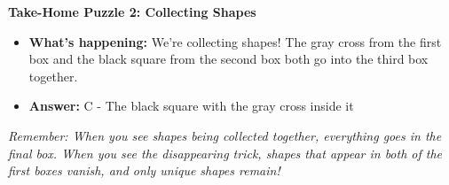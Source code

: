 \documentclass{article}
\begin{document}
\vspace{0.3cm}
\textbf{Take-Home Puzzle 2: Collecting Shapes}
\begin{itemize}
    \item \textbf{What's happening:} We're collecting shapes! The gray cross from the first box and the black square from the second box both go into the third box together.
    \item \textbf{Answer:} C - The black square with the gray cross inside it
\end{itemize}

\vspace{0.5cm}
\textit{Remember: When you see shapes being collected together, everything goes in the final box. When you see the disappearing trick, shapes that appear in both of the first boxes vanish, and only unique shapes remain!}
\end{document}
